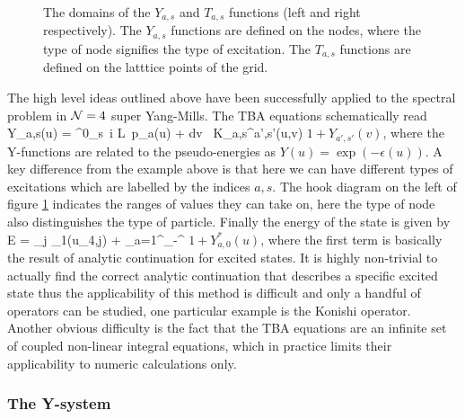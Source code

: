 \begin{figure}[t]
\caption{The domains of the $Y_{a,s}$ and $T_{a,s}$ functions (left and right respectively). The $Y_{a,s}$ functions are defined on the nodes, where the type of node signifies the type of excitation. The $T_{a,s}$ functions are defined on the latttice points of the grid.}
\label{fig:yt_hooks}
\end{figure}

The high level ideas outlined above have been successfully applied to the spectral problem in $\mathcal{N}=4$ super Yang-Mills.
The TBA equations schematically read
\beq
	\label{eq:tba_final}
	\log Y_{a,s}(u) = \delta^0_s\, i L\, p_a(u) + \int dv \, K_{a,s}^{a',s'}(u,v) \log \( 1+Y_{a',s'}(v) \),
\eeq
where the Y-functions are related to the pseudo-energies as $Y(u) = \exp(-\epsilon(u))$.
A key difference from the example above is that here we can have different types of excitations which are labelled by the indices $a,s$. 
The hook diagram on the left of figure \ref{fig:yt_hooks} indicates the ranges of values they can take on,
here the type of node also distinguishes the type of particle.
Finally the energy of the state is given by
\beq
	E = \sum_j \epsilon_1(u_{4,j}) + \sum_{a=1}^\infty \int_{-\infty}^\infty {}  \log \(1 + Y_{a,0}^* (u) \),
\eeq
where the first term is basically the result of analytic continuation for excited states.
It is highly non-trivial to actually find the correct analytic continuation that describes a specific excited state thus the applicability of this method is difficult and only a handful of operators can be studied, one particular example is the Konishi operator.
Another obvious difficulty is the fact that the TBA equations  are an infinite set of coupled non-linear integral equations, which in practice limits their applicability to numeric calculations only. 


\subsubsection{The Y-system}


